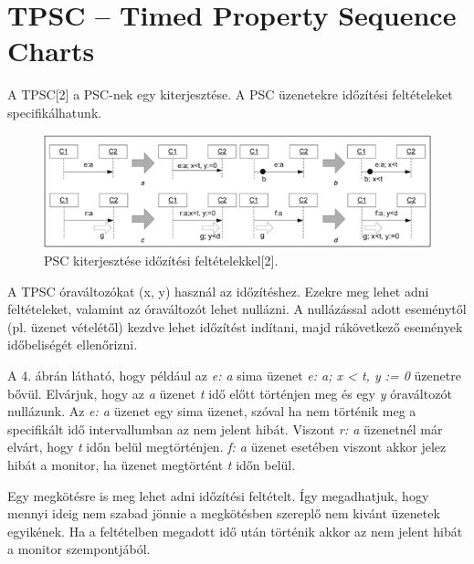 \chapter{TPSC – Timed Property Sequence Charts}
A TPSC[2] a PSC-nek egy kiterjesztése. A PSC üzenetekre időzítési feltételeket specifikálhatunk.

\begin{figure}[!ht]
    \centering
    \includegraphics[width=150mm, keepaspectratio]{figures/4abra.png}
    \caption{PSC kiterjesztése időzítési feltételekkel[2].}
\end{figure}

A TPSC óraváltozókat (x, y) használ az időzítéshez. Ezekre meg lehet adni feltételeket, valamint az óraváltozót lehet nullázni. A nullázással adott eseménytől (pl. üzenet vételétől) kezdve lehet időzítést indítani, majd rákövetkező események időbeliségét ellenőrizni.

A 4. ábrán látható, hogy például az \textit{e: a} sima üzenet \textit{e: a; x < t, y := 0} üzenetre bővül. Elvárjuk, hogy az \textit{a} üzenet \textit{t} idő előtt történjen meg és egy \textit{y} óraváltozót nullázunk. Az \textit{e: a} üzenet egy sima üzenet, szóval ha nem történik meg a specifikált idő intervallumban az nem jelent hibát. Viszont \textit{r: a} üzenetnél már elvárt, hogy \textit{t} időn belül megtörténjen. \textit{f: a} üzenet esetében viszont akkor jelez hibát a monitor, ha üzenet megtörtént \textit{t} időn belül.

Egy megkötésre is meg lehet adni időzítési feltételt. Így megadhatjuk, hogy mennyi ideig nem szabad jönnie a megkötésben szereplő nem kivánt üzenetek egyikének. Ha a feltételben megadott idő után történik akkor az nem jelent hibát a monitor szempontjából.